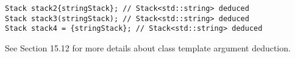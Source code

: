 \begin{lstlisting}[style=styleCXX]
Stack stack2{stringStack}; // Stack<std::string> deduced
Stack stack3(stringStack); // Stack<std::string> deduced
Stack stack4 = {stringStack}; // Stack<std::string> deduced
\end{lstlisting}

See Section 15.12 for more details about class template argument deduction.





















